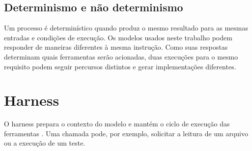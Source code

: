 \documentclass[a4paper,12pt,twoside,english,brazilian]{book}
\begin{document}
\subsection{Determinismo e não determinismo}
\label{subsec:determinismo}

Um processo é determinístico quando produz o mesmo resultado para as mesmas
entradas e condições de execução. Os modelos usados neste trabalho podem
responder de maneiras diferentes à mesma instrução. Como suas respostas
determinam quais ferramentas serão acionadas, duas execuções para o mesmo
requisito podem seguir percursos distintos e gerar implementações diferentes.

\section{Harness}
\label{cap:harness}

% 
% 
% 

O harness prepara o contexto do modelo e mantém o ciclo de execução das
ferramentas \citep{openharness}. Uma chamada pode, por exemplo, solicitar a
leitura de um arquivo ou a execução de um teste.
\end{document}
